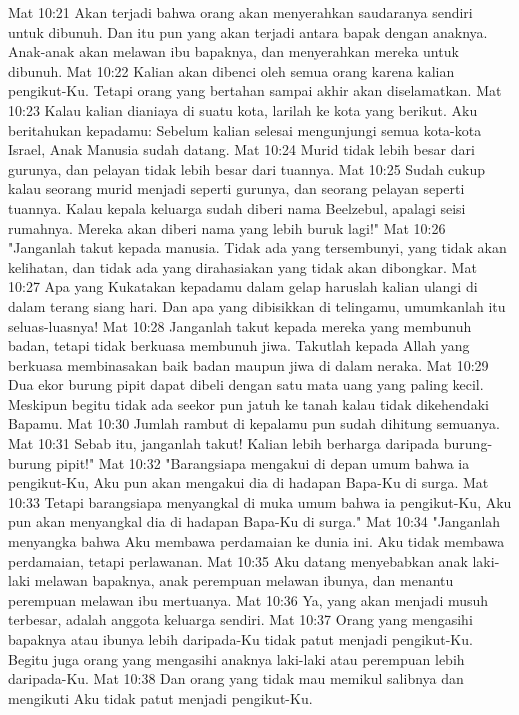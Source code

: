 Mat 10:21  Akan terjadi bahwa orang akan menyerahkan saudaranya sendiri untuk dibunuh. Dan itu pun yang akan terjadi antara bapak dengan anaknya. Anak-anak akan melawan ibu bapaknya, dan menyerahkan mereka untuk dibunuh.
Mat 10:22  Kalian akan dibenci oleh semua orang karena kalian pengikut-Ku. Tetapi orang yang bertahan sampai akhir akan diselamatkan.
Mat 10:23  Kalau kalian dianiaya di suatu kota, larilah ke kota yang berikut. Aku beritahukan kepadamu: Sebelum kalian selesai mengunjungi semua kota-kota Israel, Anak Manusia sudah datang.
Mat 10:24  Murid tidak lebih besar dari gurunya, dan pelayan tidak lebih besar dari tuannya.
Mat 10:25  Sudah cukup kalau seorang murid menjadi seperti gurunya, dan seorang pelayan seperti tuannya. Kalau kepala keluarga sudah diberi nama Beelzebul, apalagi seisi rumahnya. Mereka akan diberi nama yang lebih buruk lagi!"
Mat 10:26  "Janganlah takut kepada manusia. Tidak ada yang tersembunyi, yang tidak akan kelihatan, dan tidak ada yang dirahasiakan yang tidak akan dibongkar.
Mat 10:27  Apa yang Kukatakan kepadamu dalam gelap haruslah kalian ulangi di dalam terang siang hari. Dan apa yang dibisikkan di telingamu, umumkanlah itu seluas-luasnya!
Mat 10:28  Janganlah takut kepada mereka yang membunuh badan, tetapi tidak berkuasa membunuh jiwa. Takutlah kepada Allah yang berkuasa membinasakan baik badan maupun jiwa di dalam neraka.
Mat 10:29  Dua ekor burung pipit dapat dibeli dengan satu mata uang yang paling kecil. Meskipun begitu tidak ada seekor pun jatuh ke tanah kalau tidak dikehendaki Bapamu.
Mat 10:30  Jumlah rambut di kepalamu pun sudah dihitung semuanya.
Mat 10:31  Sebab itu, janganlah takut! Kalian lebih berharga daripada burung-burung pipit!"
Mat 10:32  "Barangsiapa mengakui di depan umum bahwa ia pengikut-Ku, Aku pun akan mengakui dia di hadapan Bapa-Ku di surga.
Mat 10:33  Tetapi barangsiapa menyangkal di muka umum bahwa ia pengikut-Ku, Aku pun akan menyangkal dia di hadapan Bapa-Ku di surga."
Mat 10:34  "Janganlah menyangka bahwa Aku membawa perdamaian ke dunia ini. Aku tidak membawa perdamaian, tetapi perlawanan.
Mat 10:35  Aku datang menyebabkan anak laki-laki melawan bapaknya, anak perempuan melawan ibunya, dan menantu perempuan melawan ibu mertuanya.
Mat 10:36  Ya, yang akan menjadi musuh terbesar, adalah anggota keluarga sendiri.
Mat 10:37  Orang yang mengasihi bapaknya atau ibunya lebih daripada-Ku tidak patut menjadi pengikut-Ku. Begitu juga orang yang mengasihi anaknya laki-laki atau perempuan lebih daripada-Ku.
Mat 10:38  Dan orang yang tidak mau memikul salibnya dan mengikuti Aku tidak patut menjadi pengikut-Ku.
